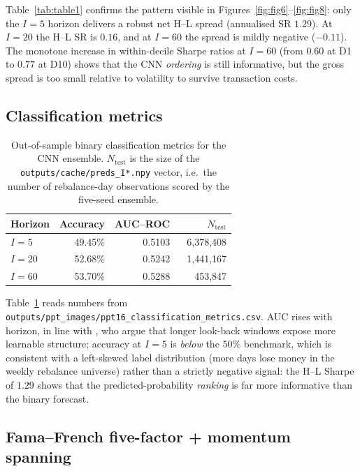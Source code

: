 \documentclass{article}
\begin{document}
Table~\ref{tab:table1} confirms the pattern visible in
Figures~\ref{fig:fig6}--\ref{fig:fig8}: only the $I=5$ horizon delivers a
robust net H--L spread (annualised SR $1.29$). At $I=20$ the H--L SR is
$0.16$, and at $I=60$ the spread is mildly negative ($-0.11$). The
monotone increase in within-decile Sharpe ratios at $I=60$ (from $0.60$
at D1 to $0.77$ at D10) shows that the CNN \emph{ordering} is still
informative, but the gross spread is too small relative to volatility to
survive transaction costs.

\subsection{Classification metrics}

\begin{table}[t]
  \centering
  \caption{Out-of-sample binary classification metrics for the CNN
    ensemble. $N_{\mathrm{test}}$ is the size of the
    \texttt{outputs/cache/preds\_I*.npy} vector, i.e.\ the number of
    rebalance-day observations scored by the five-seed ensemble.}
  \label{tab:classmetrics}
  \small
  \begin{tabular}{lrrr}
    \toprule
    Horizon & Accuracy & AUC--ROC & $N_{\mathrm{test}}$ \\
    \midrule
    $I=5$  & 49.45\% & 0.5103 & 6{,}378{,}408 \\
    $I=20$ & 52.68\% & 0.5242 & 1{,}441{,}167 \\
    $I=60$ & 53.70\% & 0.5288 & ~~~453{,}847 \\
    \bottomrule
  \end{tabular}
\end{table}

Table~\ref{tab:classmetrics} reads numbers from
\texttt{outputs/ppt\_images/ppt16\_classification\_metrics.csv}. AUC rises
with horizon, in line with \citet{jiang2023reimagining}, who argue that longer
look-back windows expose more learnable structure; accuracy at $I=5$ is
\emph{below} the $50\%$ benchmark, which is consistent with a left-skewed
label distribution (more days lose money in the weekly rebalance
universe) rather than a strictly negative signal: the H--L Sharpe of
$1.29$ shows that the predicted-probability \emph{ranking} is far more
informative than the binary forecast.

\subsection{Fama--French five-factor + momentum spanning}
\end{document}
